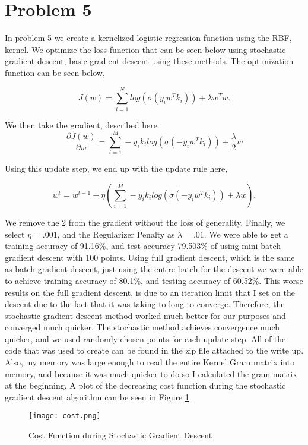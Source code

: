 \documentclass[paper=a4, fontsize=11pt]{scrartcl} %
\begin{document}
\section{Problem 5}
In problem 5 we create a kernelized logistic regression function using the RBF, kernel.
We optimize the loss function that can be seen below using stochastic gradient descent, basic gradient descent using these methods. The optimization function can be seen below,

\begin{equation}
J(w) = \sum\limits_{i=1}^N log(\sigma(y_i w^T k_i)) + \lambda w^T w.
\end{equation}

We then take the gradient, described here.
\begin{equation}
\frac{\partial J(w)}{\partial w} = \sum\limits_{i=1}^M -y_i  k_i log(\sigma(-y_i w^T k_i)) + \frac{\lambda}{2}  w
\end{equation}

Using this update step, we end up with the update rule here,

\begin{equation}
w^{t} = w^{t-1} + \eta (  \sum\limits_{i=1}^M -y_i  k_i log(\sigma(-y_i w^T k_i)) + \lambda w).
\end{equation}



We remove the 2 from the gradient without the loss of generality.
Finally, we select $\eta = .001$, and the Regularizer Penalty as $\lambda = .01$.
We were able to get a training accuracy of 91.16\%, and test accuracy 79.503\% of  using mini-batch gradient descent with 100 points.  
Using full gradient descent, which is the same as batch gradient descent, just using the entire batch for the descent we were able to achieve training accuracy of  80.1\%, and testing accuracy of 60.52\%.
This worse results on the full gradient descent, is due to an iteration limit that I set on the descent due to the fact that it was taking to long to converge.  
Therefore, the stochastic gradient descent method worked much better for our purposes and converged much quicker.
The stochastic method achieves convergence much quicker, and we used randomly chosen points for each update step.
All of the code that was used to create can be found in the zip file attached to the write up.
Also, my memory was large enough to read the entire Kernel Gram matrix into memory, and because it was much quicker to do so I calculated the gram matrix at the beginning.
A plot of the decreasing cost function during the stochastic gradient descent algorithm can be seen in Figure \ref{fig:cost}.

\begin{figure}
\centering
\texttt{[image: cost.png]}
\caption{Cost Function during Stochastic Gradient Descent}
\label{fig:cost}
\end{figure}
\end{document}
